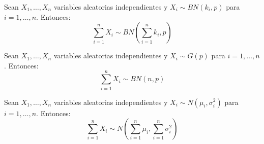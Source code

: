 \begin{prop}
    Sean $X_1, \dots, X_n$ variables aleatorias independientes y $X_i\sim BN(k_i, p)$ para $i=1,\dots,n$. Entonces:
    \begin{equation*}
        \sum_{i=1}^{n}X_i \sim BN\left(\sum_{i=1}^{n}k_i, p\right)
    \end{equation*}
\end{prop}

\begin{prop}
    Sean $X_1, \dots, X_n$ variables aleatorias independientes y $X_i\sim G(p)$ para $i=1,\dots,n$. Entonces:
    \begin{equation*}
        \sum_{i=1}^{n}X_i \sim BN(n,p)
    \end{equation*}
\end{prop}


\begin{prop}
    Sean $X_1, \dots, X_n$ variables aleatorias independientes y $X_i\sim N(\mu_i, \sigma_i^2)$ para $i=1,\dots,n$. Entonces:
    \begin{equation*}
        \sum_{i=1}^{n}X_i \sim N\left(\sum_{i=1}^{n}\mu_i, \sum_{i=1}^{n}\sigma_i^2\right)
    \end{equation*}
\end{prop}





